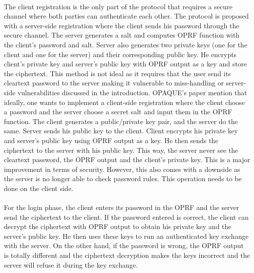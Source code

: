 ﻿\documentclass[../report.tex]{subfiles}
\begin{document}
\paragraph{} \label{sec:opaque_register}
The client registration is the only part of the protocol that requires a secure channel where both parties can authenticate each other.
The protocol is proposed with a server-side registration where the client sends his password through the secure channel. The server generates a salt and computes OPRF function with the client's password and salt. Server also generates two private keys (one for the client and one for the server) and their corresponding public key. He encrypts client's private key and server's public key with OPRF output as a key and store the ciphertext.
This method is not ideal as it requires that the user send its cleartext password to the server making it vulnerable to miss-handling or server-side vulnerabilities discussed in the introduction.
OPAQUE's paper \cite{OPAQUE_Paper} mention that ideally, one wants to implement a client-side registration where the client choose a password and the server choose a secret salt and input them in the OPRF function. The client generates a public/private key pair, and the server do the same. Server sends his public key to the client. Client encrypts his private key and server's public key using OPRF output as a key. He then sends the ciphertext to the server with his public key.
This way, the server never see the cleartext password, the OPRF output and the client's private key. This is a major improvement in terms of security.
However, this also comes with a downside as the server is no longer able to check password rules. This operation needs to be done on the client side.


\paragraph{}
For the login phase, the client enters its password in the OPRF and the server send the ciphertext to the client.
If the password entered is correct, the client can decrypt the ciphertext with OPRF output to obtain his private key and the server's public key.
He then uses these keys to run an authenticated key exchange with the server.
On the other hand, if the password is wrong, the OPRF output is totally different and the ciphertext decryption makes the keys incorrect and the server will refuse it during the key exchange. %
\end{document}
